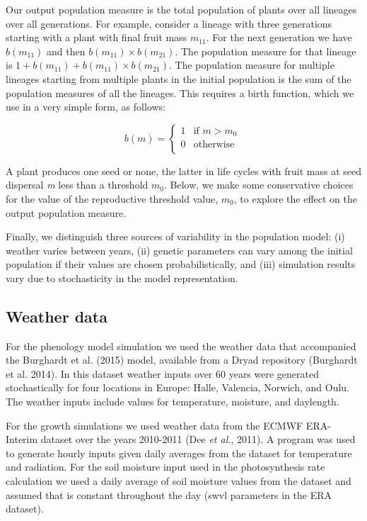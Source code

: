 \documentclass[phd]{infthesis}
\begin{document}
Our output population measure is the total population of plants over all
lineages over all generations. For example, consider a lineage with
three generations starting with a plant with final fruit mass
\(m_{11}\). For the next generation we have \(b(m_{11})\) and then
\(b(m_{11}) \times b(m_{21})\). The population measure for that lineage
is \(1 + b(m_{11}) + b(m_{11}) \times b(m_{21})\). The population
measure for multiple lineages starting from multiple plants in the
initial population is the sum of the population measures of all the
lineages. This requires a birth function, which we use in a very simple
form, as follows:

\[b\left( m \right) = \left\{ \begin{matrix}
1 & \text{if\ }m > m_{0} \\
0 & \text{otherwise} \\
\end{matrix} \right.\ \]

A plant produces one seed or none, the latter in life cycles with fruit
mass at seed dispersal \emph{m} less than a threshold \(m_{0}\). Below,
we make some conservative choices for the value of the reproductive
threshold value, \(m_{0}\), to explore the effect on the output
population measure.

Finally, we distinguish three sources of variability in the population
model: (i) weather varies between years, (ii) genetic parameters can
vary among the initial population if their values are chosen
probabilistically, and (iii) simulation results vary due to
stochasticity in the model representation.

\subsection{Weather data}
\label{weather-data}

For the phenology model simulation we used the weather data that
accompanied the Burghardt et al. (2015) model, available from a Dryad
repository (Burghardt et al. 2014). In this dataset weather inputs over
60 years were generated stochastically for four locations in Europe:
Halle, Valencia, Norwich, and Oulu. The weather inputs include values
for temperature, moisture, and daylength.

For the growth simulations we used weather data from the ECMWF
ERA-Interim dataset over the years 2010-2011 (Dee \emph{et al.}, 2011).
A program was used to generate hourly inputs given daily averages from
the dataset for temperature and radiation. For the soil moisture input
used in the photosynthesis rate calculation we used a daily average of
soil moisture values from the dataset and assumed that is constant
throughout the day (swvl parameters in the ERA dataset).
\end{document}
